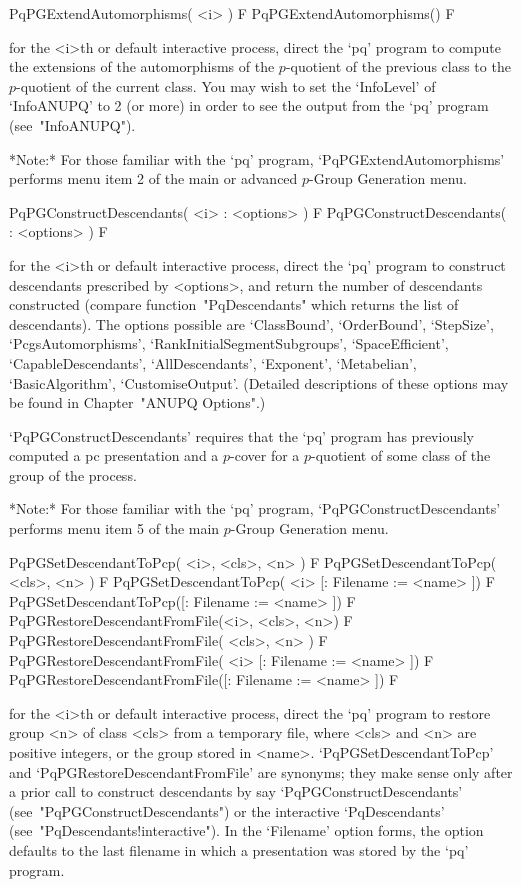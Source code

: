 \>PqPGExtendAutomorphisms( <i> ) F
\>PqPGExtendAutomorphisms() F

for the <i>th  or default interactive {\ANUPQ} process,  direct  the `pq'
program  to   compute  the  extensions   of  the  automorphisms   of  the
$p$-quotient of  the previous  class to the  $p$-quotient of  the current
class.  You may wish to set the `InfoLevel' of `InfoANUPQ' to 2 (or more)
in order to see the output from the `pq' program (see~"InfoANUPQ").

*Note:*    
For  those  familiar  with  the  `pq'  program,  `PqPGExtendAutomorphisms'
performs menu item 2 of the main or advanced $p$-Group Generation menu. 

\>PqPGConstructDescendants( <i> : <options> ) F
\>PqPGConstructDescendants( : <options> ) F

for the  <i>th or default  interactive {\ANUPQ} process, direct  the `pq'
program to construct descendants  prescribed by <options>, and return the
number of descendants constructed (compare function~"PqDescendants" which
returns the list of descendants).  The options possible are `ClassBound',
`OrderBound',               `StepSize',              `PcgsAutomorphisms',
`RankInitialSegmentSubgroups',   `SpaceEfficient',  `CapableDescendants',
`AllDescendants',     `Exponent',     `Metabelian',     `BasicAlgorithm',
`CustomiseOutput'.  (Detailed descriptions of  these options may be found
in Chapter~"ANUPQ Options".)

`PqPGConstructDescendants' requires that the `pq' program  has  previously
computed a pc presentation and a $p$-cover for  a  $p$-quotient  of  some
class of the group of the process.

*Note:* 
For those  familiar  with  the  `pq'  program,  `PqPGConstructDescendants'
performs menu item 5 of the main $p$-Group Generation menu.

\>PqPGSetDescendantToPcp( <i>, <cls>, <n> ) F
\>PqPGSetDescendantToPcp( <cls>, <n> ) F
\>PqPGSetDescendantToPcp( <i> [: Filename := <name> ]) F
\>PqPGSetDescendantToPcp([: Filename := <name> ]) F
\>PqPGRestoreDescendantFromFile(<i>, <cls>, <n>) F
\>PqPGRestoreDescendantFromFile( <cls>, <n> ) F
\>PqPGRestoreDescendantFromFile( <i> [: Filename := <name> ]) F
\>PqPGRestoreDescendantFromFile([: Filename := <name> ]) F

for the <i>th or default interactive {\ANUPQ} process,  direct  the  `pq'
program to restore group <n> of class <cls> from a temporary file,  where
<cls> and <n> are positive integers,  or  the  group  stored  in  <name>.
`PqPGSetDescendantToPcp'    and    `PqPGRestoreDescendantFromFile'    are
synonyms;  they  make  sense  only  after  a  prior  call  to   construct
descendants          by          say           `PqPGConstructDescendants'
(see~"PqPGConstructDescendants")  or  the   interactive   `PqDescendants'
(see~"PqDescendants!interactive"). In the `Filename'  option  forms,  the
option defaults to the last filename in which a presentation  was  stored
by the `pq' program.

